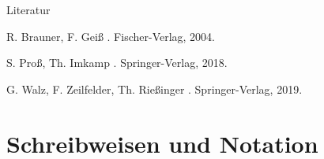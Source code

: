 \documentclass[german]{beamer}
\begin{document}
\begin{frame}{Literatur}

  \begin{thebibliography}{10}
    
  \beamertemplatebookbibitems

    R. Brauner, F. Gei{\ss}
    .
    \newblock Fischer-Verlag, 2004.

    S. Pro{\ss}, Th. Imkamp
    .
    \newblock Springer-Verlag, 2018.

    G. Walz, F. Zeilfelder, Th. Rie{\ss}inger
    .
    \newblock Springer-Verlag, 2019.

  \end{thebibliography}


\end{frame}



\section{Schreibweisen und Notation}

\frame{\sectionpage}

\end{document}

